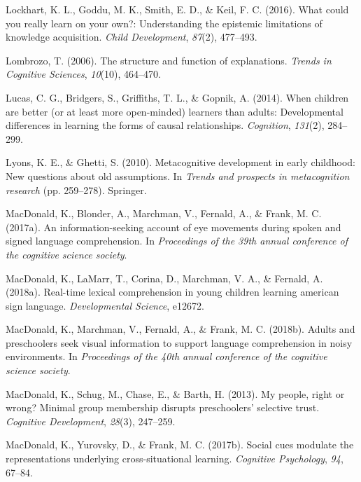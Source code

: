 \documentclass[oneside]{report}
\begin{document}
\leavevmode\hypertarget{ref-lockhart2016could}{}%
Lockhart, K. L., Goddu, M. K., Smith, E. D., \& Keil, F. C. (2016). What
could you really learn on your own?: Understanding the epistemic
limitations of knowledge acquisition. \emph{Child Development},
\emph{87}(2), 477--493.

\leavevmode\hypertarget{ref-lombrozo2006structure}{}%
Lombrozo, T. (2006). The structure and function of explanations.
\emph{Trends in Cognitive Sciences}, \emph{10}(10), 464--470.

\leavevmode\hypertarget{ref-lucas2014children}{}%
Lucas, C. G., Bridgers, S., Griffiths, T. L., \& Gopnik, A. (2014). When
children are better (or at least more open-minded) learners than adults:
Developmental differences in learning the forms of causal relationships.
\emph{Cognition}, \emph{131}(2), 284--299.

\leavevmode\hypertarget{ref-lyons2010metacognitive}{}%
Lyons, K. E., \& Ghetti, S. (2010). Metacognitive development in early
childhood: New questions about old assumptions. In \emph{Trends and
prospects in metacognition research} (pp. 259--278). Springer.

\leavevmode\hypertarget{ref-macdonald2017info}{}%
MacDonald, K., Blonder, A., Marchman, V., Fernald, A., \& Frank, M. C.
(2017a). An information-seeking account of eye movements during spoken
and signed language comprehension. In \emph{Proceedings of the 39th
annual conference of the cognitive science society}.

\leavevmode\hypertarget{ref-macdonald2018real}{}%
MacDonald, K., LaMarr, T., Corina, D., Marchman, V. A., \& Fernald, A.
(2018a). Real-time lexical comprehension in young children learning
american sign language. \emph{Developmental Science}, e12672.

\leavevmode\hypertarget{ref-macdonald2018noise}{}%
MacDonald, K., Marchman, V., Fernald, A., \& Frank, M. C. (2018b).
Adults and preschoolers seek visual information to support language
comprehension in noisy environments. In \emph{Proceedings of the 40th
annual conference of the cognitive science society}.

\leavevmode\hypertarget{ref-macdonald2013my}{}%
MacDonald, K., Schug, M., Chase, E., \& Barth, H. (2013). My people,
right or wrong? Minimal group membership disrupts preschoolers'
selective trust. \emph{Cognitive Development}, \emph{28}(3), 247--259.

\leavevmode\hypertarget{ref-macdonald2017social}{}%
MacDonald, K., Yurovsky, D., \& Frank, M. C. (2017b). Social cues
modulate the representations underlying cross-situational learning.
\emph{Cognitive Psychology}, \emph{94}, 67--84.
\end{document}
